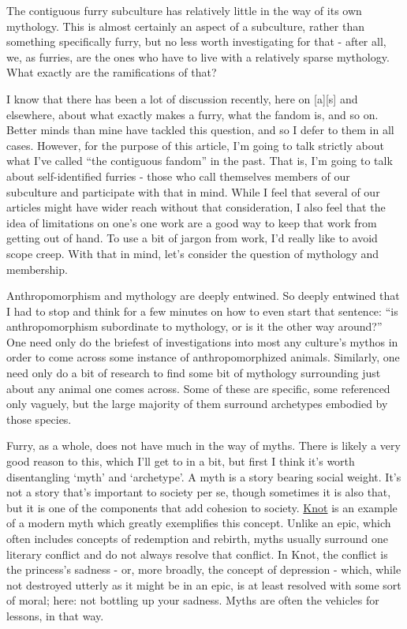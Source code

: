 The contiguous furry subculture has relatively little in the way of its
own mythology. This is almost certainly an aspect of a subculture,
rather than something specifically furry, but no less worth
investigating for that - after all, we, as furries, are the ones who
have to live with a relatively sparse mythology. What exactly are the
ramifications of that?

I know that there has been a lot of discussion recently, here on
{[}a{]}{[}s{]} and elsewhere, about what exactly makes a furry, what the
fandom is, and so on. Better minds than mine have tackled this question,
and so I defer to them in all cases. However, for the purpose of this
article, I'm going to talk strictly about what I've called ``the
contiguous fandom'' in the past. That is, I'm going to talk about
self-identified furries - those who call themselves members of our
subculture and participate with that in mind. While I feel that several
of our articles might have wider reach without that consideration, I
also feel that the idea of limitations on one's one work are a good way
to keep that work from getting out of hand. To use a bit of jargon from
work, I'd really like to avoid scope creep. With that in mind, let's
consider the question of mythology and membership.

Anthropomorphism and mythology are deeply entwined. So deeply entwined
that I had to stop and think for a few minutes on how to even start that
sentence: ``is anthropomorphism subordinate to mythology, or is it the
other way around?'' One need only do the briefest of investigations into
most any culture's mythos in order to come across some instance of
anthropomorphized animals. Similarly, one need only do a bit of research
to find some bit of mythology surrounding just about any animal one
comes across. Some of these are specific, some referenced only vaguely,
but the large majority of them surround archetypes embodied by those
species.

Furry, as a whole, does not have much in the way of myths. There is
likely a very good reason to this, which I'll get to in a bit, but first
I think it's worth disentangling `myth' and `archetype'. A myth is a
story bearing social weight. It's not a story that's important to
society per se, though sometimes it is also that, but it is one of the
components that add cohesion to society.
\href{http://secondlina.tumblr.com/post/76073595885/here-is-knot-a-short-comic-i-drew-to-sell-at}{Knot}
is an example of a modern myth which greatly exemplifies this concept.
Unlike an epic, which often includes concepts of redemption and rebirth,
myths usually surround one literary conflict and do not always resolve
that conflict. In Knot, the conflict is the princess's sadness - or,
more broadly, the concept of depression - which, while not destroyed
utterly as it might be in an epic, is at least resolved with some sort
of moral; here: not bottling up your sadness. Myths are often the
vehicles for lessons, in that way.

